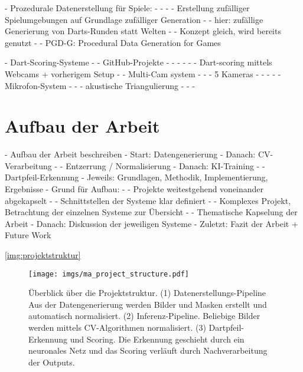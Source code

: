 - Prozedurale Datenerstellung für Spiele:
- - \cite{proc_data_games_1,proc_data_games_2,proc_data_games_3}
- - Erstellung zufälliger Spielumgebungen auf Grundlage zufälliger Generation
- - hier: zufällige Generierung von Darts-Runden statt Welten
- - Konzept gleich, wird bereits genutzt
- - PGD-G: Procedural Data Generation for Games

- Dart-Scoring-Systeme
- - GitHub-Projekte
- - - \cite{darts_project_1,darts_project_2,darts_project_3,darts_proect_4}
- - - Dart-scoring mittels Webcams + vorherigem Setup
- - Multi-Cam system
- - - 5 Kameras
- - - \cite{dart_scoring_multicam}
- - Mikrofon-System
- - - akustische Triangulierung
- - - \cite{dart_scoring_microphone}



\section{Aufbau der Arbeit}
\label{sec:aufbau}

- Aufbau der Arbeit beschreiben
- Start: Datengenerierung
- Danach: CV-Verarbeitung
- - Entzerrung / Normalisierung
- Danach: KI-Training
- - Dartpfeil-Erkennung
- Jeweils: Grundlagen, Methodik, Implementierung, Ergebnisse
- Grund für Aufbau:
- - Projekte weitestgehend voneinander abgekapselt
- - Schnittstellen der Systeme klar definiert
- - Komplexes Projekt, Betrachtung der einzelnen Systeme zur Übersicht
- - Thematische Kapselung der Arbeit
- Danach: Diskussion der jeweiligen Systeme
- Zuletzt: Fazit der Arbeit + Future Work



\autoref{img:projektstruktur}

\begin{figure}
    \centering
    \texttt{[image: imgs/ma\_project\_structure.pdf]}
    \caption{Überblick über die Projektstruktur. (1) Datenerstellungs-Pipeline Aus der Datengenerierung werden Bilder und Masken erstellt und automatisch normalisiert. (2) Inferenz-Pipeline. Beliebige Bilder werden mittels CV-Algorithmen normalisiert. (3) Dartpfeil-Erkennung und Scoring. Die Erkennung geschieht durch ein neuronales Netz und das Scoring verläuft durch Nachverarbeitung der Outputs.}
    \label{img:projektstruktur}
\end{figure}

